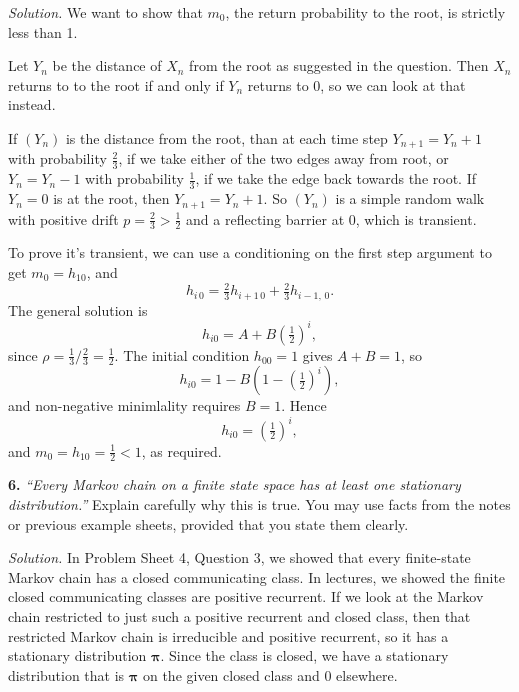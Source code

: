 \documentclass[
  a4paper,
]{article}
\theoremstyle{definition}
\theoremstyle{definition}
\theoremstyle{definition}
\theoremstyle{remark}
\begin{document}
\begin{myanswers}
\emph{Solution.} We want to show that \(m_0\), the return probability to the root, is strictly less than 1.

Let \(Y_n\) be the distance of \(X_n\) from the root as suggested in the question. Then \(X_n\) returns to to the root if and only if \(Y_n\) returns to \(0\), so we can look at that instead.

If \((Y_n)\) is the distance from the root, than at each time step \(Y_{n+1} = Y_n + 1\) with probability \(\frac23\), if we take either of the two edges away from root, or \(Y_n = Y_n - 1\) with probability \(\frac13\), if we take the edge back towards the root. If \(Y_n = 0\) is at the root, then \(Y_{n+1} = Y_n+1\). So \((Y_n)\) is a simple random walk with positive drift \(p = \frac23 > \frac12\) and a reflecting barrier at \(0\), which is transient.

To prove it's transient, we can use a conditioning on the first step argument to get \(m_0 = h_{10}\), and
\[ h_{i\,0} = \tfrac23 h_{i+1\,0} + \tfrac23 h_{i-1,\,0} . \]
The general solution is
\[ h_{i0} = A + B\left(\tfrac12\right)^i , \]
since \(\rho = \frac13 / \frac23 = \frac12\). The initial condition \(h_{00} = 1\) gives \(A + B = 1\), so
\[ h_{i0} = 1 - B\left(1 - \left(\tfrac12\right)^i\right) , \]
and non-negative minimlality requires \(B = 1\). Hence
\[ h_{i0} = \left(\tfrac12\right)^i , \]
and \(m_0 = h_{10} = \frac12 < 1\), as required.

\end{myanswers}

\textbf{6.} \emph{``Every Markov chain on a finite state space has at least one stationary distribution.''} Explain carefully why this is true. You may use facts from the notes or previous example sheets, provided that you state them clearly.

\begin{myanswers}
\emph{Solution.} In Problem Sheet 4, Question 3, we showed that every finite-state Markov chain has a closed communicating class. In lectures, we showed the finite closed communicating classes are positive recurrent. If we look at the Markov chain restricted to just such a positive recurrent and closed class, then that restricted Markov chain is irreducible and positive recurrent, so it has a stationary distribution \(\boldsymbol\pi\). Since the class is closed, we have a stationary distribution that is \(\boldsymbol\pi\) on the given closed class and \(0\) elsewhere.

\end{myanswers}
\end{document}
